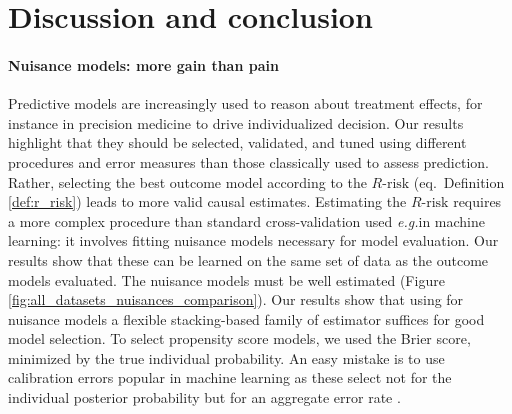 \documentclass[11pt]{article}
\let\cite=\supercite
\newcommand{\eg}{\emph{e.g.}}
\begin{document}
\section{Discussion and conclusion}\label{sec:discussion}\label{sec:conclusion}


\paragraph{Nuisance models: more gain than pain}
%
Predictive models are increasingly used to reason about treatment effects, for
instance in precision medicine to drive individualized decision. Our results
highlight that they should be selected, validated, and tuned using different
procedures and error measures than those classically used to assess prediction. Rather, selecting the best outcome
model according to the $R\text{-risk}$ (eq.\, Definition \ref{def:r_risk}) leads
to more valid causal estimates. Estimating the $R\text{-risk}$ requires a more
complex procedure than standard cross-validation used \eg in machine
learning: it involves fitting nuisance models necessary for model
evaluation.
Our results show that these can be learned on the same set of data as the
outcome models evaluated. The nuisance models must be well estimated (Figure
\ref{fig:all_datasets_nuisances_comparison}). Our results show that using for
nuisance models a flexible stacking-based family of estimator suffices for good
model selection. To select propensity score models, we used the Brier score,
minimized by the true individual probability. An easy mistake is to
use calibration errors popular in machine learning
\cite{platt_probabilistic_1999,zadrozny_obtaining_2001,niculescu-mizil_predicting_2005,minderer_revisiting_2021}
as these select not for the individual posterior probability but for an
aggregate error rate \cite{perez2022beyond}.


%
\end{document}

